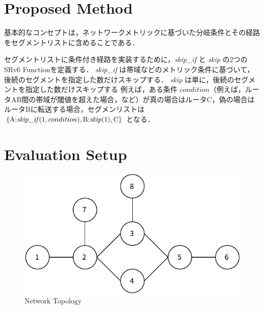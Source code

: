 \documentclass[conference]{IEEEtran}
\begin{document}
\section{Proposed Method}

基本的なコンセプトは，ネットワークメトリックに基づいた分岐条件とその経路をセグメントリストに含めることである．

セグメントリストに条件付き経路を実装するために，\textit{skip\_if} と \textit{skip} の2つのSRv6 Functionを定義する．
\textit{skip\_if} は帯域などのメトリック条件に基づいて，後続のセグメントを指定した数だけスキップする．
\textit{skip} は単に，後続のセグメントを指定した数だけスキップする
例えば，ある条件 $condition$（例えば，ルータAB間の帯域が閾値を超えた場合，など）が真の場合はルータC，偽の場合はルータBに転送する場合，セグメンリストは $\{ \text{A:\textit{skip\_if}}(1, condition), \text{B:\textit{skip}}(1), \text{C} \}$ となる．


\section{Evaluation Setup}

\begin{figure}[t]
  \centering
  \includegraphics[width=0.7\linewidth]{./figures/topo.pdf}
  \caption{Network Topology}
  \label{fig:network-topology}
\end{figure}
\end{document}
